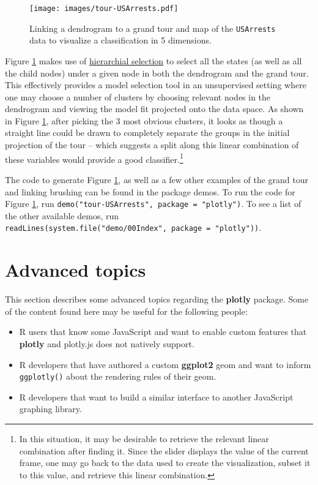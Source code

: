 \documentclass[12pt,]{isuthesis}
\providecommand{\tightlist}{%
  \setlength{\itemsep}{0pt}\setlength{\parskip}{0pt}}
\let\rmarkdownfootnote\footnote%
\def\footnote{\protect\rmarkdownfootnote}
\begin{document}
\begin{figure}
\centering
\texttt{[image: images/tour-USArrests.pdf]}
\caption{\label{fig:tour-USArrests}Linking a dendrogram to a grand tour and
map of the \texttt{USArrests} data to visualize a classification in 5
dimensions.}
\end{figure}

Figure \ref{fig:tour-USArrests} makes use of
\protect\hyperlink{hierarchial-selection}{hierarchial selection} to
select all the states (as well as all the child nodes) under a given
node in both the dendrogram and the grand tour. This effectively
provides a model selection tool in an unsupervised setting where one may
choose a number of clusters by choosing relevant nodes in the dendrogram
and viewing the model fit projected onto the data space. As shown in
Figure \ref{fig:tour-USArrests}, after picking the 3 most obvious
clusters, it looks as though a straight line could be drawn to
completely separate the groups in the initial projection of the tour --
which suggests a split along this linear combination of these variables
would provide a good classifier.\footnote{In this situation, it may be
  desirable to retrieve the relevant linear combination after finding
  it. Since the slider displays the value of the current frame, one may
  go back to the data used to create the visualization, subset it to
  this value, and retrieve this linear combination.}

The code to generate Figure \ref{fig:tour-USArrests}, as well as a few
other examples of the grand tour and linking brushing can be found in
the package demos. To run the code for Figure \ref{fig:tour-USArrests},
run \texttt{demo("tour-USArrests",\ package\ =\ "plotly")}. To see a
list of the other available demos, run
\texttt{readLines(system.file("demo/00Index",\ package\ =\ "plotly"))}.

\section{Advanced topics}\label{advanced-topics}

This section describes some advanced topics regarding the
\textbf{plotly} package. Some of the content found here may be useful
for the following people:

\begin{itemize}
\tightlist
\item
  R users that know some JavaScript and want to enable custom features
  that \textbf{plotly} and plotly.js does not natively support.
\item
  R developers that have authored a custom \textbf{ggplot2} geom and
  want to inform \texttt{ggplotly()} about the rendering rules of their
  geom.
\item
  R developers that want to build a similar interface to another
  JavaScript graphing library.
\end{itemize}
\end{document}

